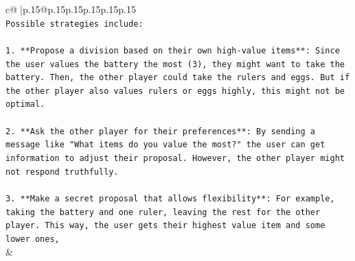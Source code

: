 \documentclass{article}
\begin{document}
{\begin{supertabular}{c@{$\;$}|p{.15\linewidth}@{}p{.15\linewidth}p{.15\linewidth}p{.15\linewidth}p{.15\linewidth}p{.15\linewidth}}
{{{\\ 
\texttt{Possible strategies include:} \\
\\ 
\texttt{1. **Propose a division based on their own high{-}value items**: Since the user values the battery the most (3), they might want to take the battery. Then, the other player could take the rulers and eggs. But if the other player also values rulers or eggs highly, this might not be optimal.} \\
\\ 
\texttt{2. **Ask the other player for their preferences**: By sending a message like "What items do you value the most?" the user can get information to adjust their proposal. However, the other player might not respond truthfully.} \\
\\ 
\texttt{3. **Make a secret proposal that allows flexibility**: For example, taking the battery and one ruler, leaving the rest for the other player. This way, the user gets their highest value item and some lower ones,} \\
            }
        }
    }
    & \\ \\


\end{supertabular}}
\end{document}

